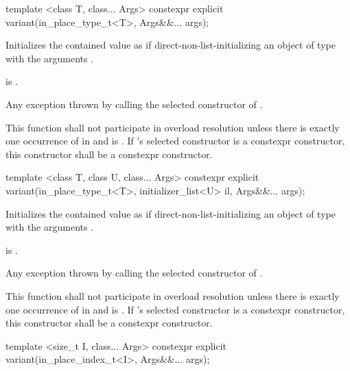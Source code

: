 %
\begin{itemdecl}
template <class T, class... Args> constexpr explicit variant(in_place_type_t<T>, Args&&... args);
\end{itemdecl}

\begin{itemdescr}
\pnum
\effects
Initializes the contained value as if direct-non-list-initializing
an object of type 
with the arguments .

\pnum
\postconditions
{} is .

\pnum
\throws
Any exception thrown by calling the selected constructor of .

\pnum
\remarks
This function shall not participate in overload resolution unless there is
exactly one occurrence of  in  and
 is .
If 's selected constructor is a constexpr constructor, this
constructor shall be a constexpr constructor.
\end{itemdescr}

%
\begin{itemdecl}
template <class T, class U, class... Args>
  constexpr explicit variant(in_place_type_t<T>, initializer_list<U> il, Args&&... args);
\end{itemdecl}

\begin{itemdescr}
\pnum
\effects
Initializes the contained value as if direct-non-list-initializing
an object of type 
with the arguments .

\pnum
\postconditions
{} is .

\pnum
\throws
Any exception thrown by calling the selected constructor of .

\pnum
\remarks
This function shall not participate in overload resolution unless there is
exactly one occurrence of  in  and
 is .
If 's selected constructor is a constexpr constructor, this
constructor shall be a constexpr constructor.
\end{itemdescr}

%
\begin{itemdecl}
template <size_t I, class... Args> constexpr explicit variant(in_place_index_t<I>, Args&&... args);
\end{itemdecl}

